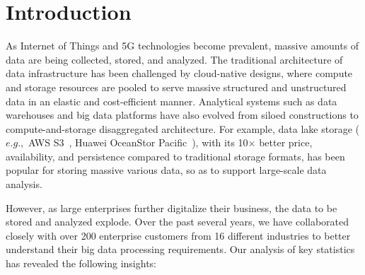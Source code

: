 \section{Introduction} 
\label{sec:intro}


As  Internet of Things and 5G  technologies become  prevalent, massive amounts of data are being collected, stored, and analyzed.
 The traditional architecture of data infrastructure  has been challenged by cloud-native designs, where compute and storage resources are pooled to serve massive structured and unstructured data in an elastic and cost-efficient manner.
  Analytical systems such as data warehouses and big data platforms have also evolved from siloed constructions to compute-and-storage disaggregated architecture. For example, data lake storage ($e.g.,$ AWS S3~\cite{s3}, Huawei OceanStor Pacific~\cite{huawei}), with its 10$\times$ better price, availability, and persistence compared to traditional storage formats, has been  popular for storing massive various data, so as to support large-scale data analysis.


However, as large enterprises further digitalize their business, the data to be stored and analyzed explode. Over the past several years, we have collaborated closely with over 200 enterprise customers from 16 different industries to better understand their big data processing requirements. Our analysis of key statistics has revealed the following insights:

